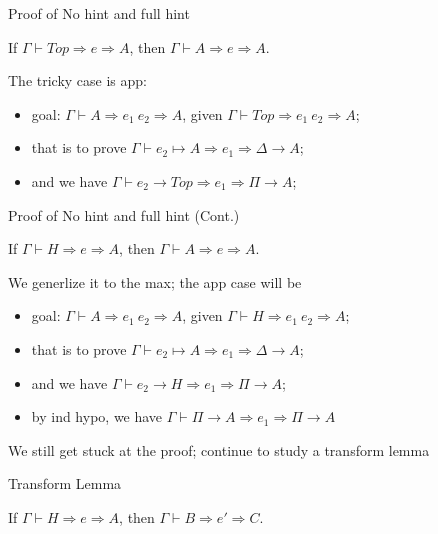 \begin{frame}{Proof of No hint and full hint}
\begin{lemma}
If $\Gamma \vdash Top \Rightarrow e \Rightarrow A$, then $\Gamma \vdash A \Rightarrow e \Rightarrow A$.
\end{lemma}
The tricky case is app:
\begin{itemize}
	\item goal: $\Gamma \vdash A \Rightarrow e_1~e_2 \Rightarrow A$, given $\Gamma \vdash Top \Rightarrow e_1~e_2 \Rightarrow A$;
	\item that is to prove $\Gamma \vdash \boxed{e_2} \mapsto A \Rightarrow e_1 \Rightarrow \Delta \rightarrow A$;
	\item and we have $\Gamma \vdash \boxed{e_2} \rightarrow Top \Rightarrow e_1 \Rightarrow \Pi \rightarrow A$;
\end{itemize}
\end{frame}

\begin{frame}{Proof of No hint and full hint (Cont.)}
\begin{lemma}
If $\Gamma \vdash H \Rightarrow e \Rightarrow A$, then $\Gamma \vdash A \Rightarrow e \Rightarrow A$.
\end{lemma}

We generlize it to the max; the app case will be
\begin{itemize}
	\item goal: $\Gamma \vdash A \Rightarrow e_1~e_2 \Rightarrow A$, given $\Gamma \vdash H \Rightarrow e_1~e_2 \Rightarrow A$;
	\item that is to prove $\Gamma \vdash \boxed{e_2} \mapsto A \Rightarrow e_1 \Rightarrow \Delta \rightarrow A$;
	\item and we have $\Gamma \vdash \boxed{e_2} \rightarrow H \Rightarrow e_1 \Rightarrow \Pi \rightarrow A$;
	\item by ind hypo, we have $\Gamma \vdash \Pi \rightarrow A \Rightarrow e_1 \Rightarrow \Pi \rightarrow A$
\end{itemize}

We still get stuck at the proof; continue to study a transform lemma
\end{frame}

\begin{frame}{Transform Lemma}
\begin{lemma}
If $\Gamma \vdash H \Rightarrow e \Rightarrow A$, then $\Gamma \vdash B \Rightarrow e' \Rightarrow	C$.
\end{lemma}
	
\end{frame}